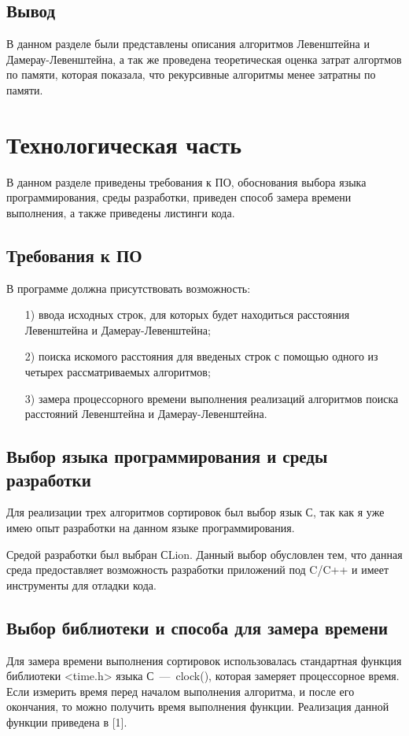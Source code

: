 \documentclass[12pt]{report}
\begin{document}
	\section*{Вывод}
	
	В данном разделе были представлены описания алгоритмов Левенштейна и Дамерау-Левенштейна, а так же проведена теоретическая оценка затрат алгортмов по памяти, которая показала, что рекурсивные алгоритмы менее затратны по памяти.
	
	\chapter{Технологическая часть}
	
	В данном разделе приведены требования к ПО, обоснования выбора языка программирования, среды разработки, приведен способ замера времени выполнения, а также приведены листинги кода.
	
	\section{Требования к ПО}
	
	В программе должна присутствовать возможность:
	
	\begin{enumerate}
		\item[1)] ввода исходных строк, для которых будет находиться расстояния Левенштейна и Дамерау-Левенштейна;
		\item[2)] поиска искомого расстояния для введеных строк с помощью одного из четырех рассматриваемых алгоритмов;
		\item[3)] замера процессорного времени выполнения реализаций алгоритмов поиска расстояний Левенштейна и Дамерау-Левенштейна.
	\end{enumerate}
	
	\section{Выбор языка программирования и среды разработки}
	
	Для реализации трех алгоритмов сортировок был выбор язык С, так как я уже имею опыт разработки на данном языке программирования.

	Средой разработки был выбран СLion. Данный выбор обусловлен тем, что данная среда предоставляет возможность разработки приложений под C/C++ и имеет инструменты для отладки кода. 
	
	\section{Выбор библиотеки и способа для замера времени}
		Для замера времени выполнения сортировок использовалась стандартная функция библиотеки <time.h> языка С~---~clock(), которая замеряет процессорное время. Если измерить время перед началом выполнения алгоритма, и после его окончания, то можно получить время выполнения функции. Реализация данной функции приведена в [1].
		
\end{document}
